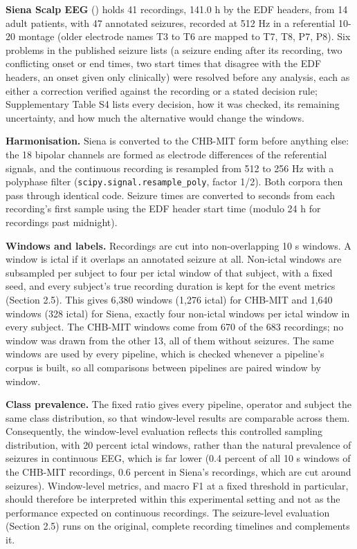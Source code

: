 \documentclass[11pt,a4paper]{article}
\begin{document}
\textbf{Siena Scalp EEG} (\citealp{Detti_2020}) holds 41 recordings, 141.0 h by the EDF
headers, from 14 adult patients, with 47 annotated seizures, recorded at 512 Hz in a
referential 10-20 montage (older electrode names T3 to T6 are mapped to T7, T8, P7,
P8). Six problems in the published seizure lists (a seizure ending after its
recording, two conflicting onset or end times, two start times that disagree with the
EDF headers, an onset given only clinically) were resolved before any analysis, each
as either a correction verified against the recording or a stated decision rule;
Supplementary Table S4 lists every decision, how it was checked, its remaining
uncertainty, and how much the alternative would change the windows.

\textbf{Harmonisation.} Siena is converted to the CHB-MIT form before anything else: the
18 bipolar channels are formed as electrode differences of the referential signals,
and the continuous recording is resampled from 512 to 256 Hz with a polyphase filter
(\nolinkurl{scipy.signal.resample_poly}, factor 1/2). Both
corpora then pass through identical code. Seizure times are converted to seconds from
each recording's first sample using the EDF header start time (modulo 24 h for
recordings past midnight).

\textbf{Windows and labels.} Recordings are cut into non-overlapping 10 s windows. A window
is ictal if it overlaps an annotated seizure at all. Non-ictal windows are subsampled
per subject to four per ictal window of that subject, with a fixed seed, and every
subject's true recording duration is kept for the event metrics (Section 2.5). This
gives 6,380 windows (1,276 ictal) for CHB-MIT and 1,640 windows (328 ictal) for Siena,
exactly four non-ictal windows per ictal window in every subject. The CHB-MIT windows
come from 670 of the 683 recordings; no window was drawn from the other 13, all of them
without seizures. The same windows are used by every pipeline, which is checked
whenever a pipeline's corpus is built, so all comparisons between pipelines are paired
window by window.

\textbf{Class prevalence.} The fixed ratio gives every pipeline, operator and subject the
same class distribution, so that window-level results are comparable across them.
Consequently, the window-level evaluation reflects this controlled sampling
distribution, with 20 percent ictal windows, rather than the natural prevalence of
seizures in continuous EEG, which is far lower (0.4 percent of all 10 s windows of the
CHB-MIT recordings, 0.6 percent in Siena's recordings, which are cut around seizures). Window-level metrics, and macro F1 at a fixed threshold in particular, should
therefore be interpreted within this experimental setting and not as the performance
expected on continuous recordings. The seizure-level evaluation (Section 2.5) runs on
the original, complete recording timelines and complements it.
\end{document}
